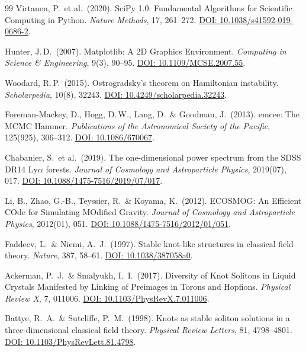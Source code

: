 \documentclass[aps,prd,twocolumn,superscriptaddress,nofootinbib]{revtex4-2}
\begin{document}
\begin{thebibliography}{99}
Virtanen, P.\ et al.\ (2020).
SciPy 1.0: Fundamental Algorithms for Scientific Computing in Python.
\textit{Nature Methods}, 17, 261--272.
\href{https://doi.org/10.1038/s41592-019-0686-2}{DOI: 10.1038/s41592-019-0686-2}.

Hunter, J.\,D.\ (2007).
Matplotlib: A 2D Graphics Environment.
\textit{Computing in Science \& Engineering}, 9(3), 90--95.
\href{https://doi.org/10.1109/MCSE.2007.55}{DOI: 10.1109/MCSE.2007.55}.

Woodard, R.\,P.\ (2015).
Ostrogradsky's theorem on Hamiltonian instability.
\textit{Scholarpedia}, 10(8), 32243.
\href{https://doi.org/10.4249/scholarpedia.32243}{DOI: 10.4249/scholarpedia.32243}.

Foreman-Mackey, D., Hogg, D.\,W., Lang, D.\ \& Goodman, J.\ (2013).
emcee: The MCMC Hammer.
\textit{Publications of the Astronomical Society of the Pacific}, 125(925), 306--312.
\href{https://doi.org/10.1086/670067}{DOI: 10.1086/670067}.

Chabanier, S.\ et al.\ (2019).
The one-dimensional power spectrum from the SDSS DR14 Ly$\alpha$ forests.
\textit{Journal of Cosmology and Astroparticle Physics}, 2019(07), 017.
\href{https://doi.org/10.1088/1475-7516/2019/07/017}{DOI: 10.1088/1475-7516/2019/07/017}.

Li, B., Zhao, G.-B., Teyssier, R.\ \& Koyama, K.\ (2012).
ECOSMOG: An Efficient COde for Simulating MOdified Gravity.
\textit{Journal of Cosmology and Astroparticle Physics}, 2012(01), 051.
\href{https://doi.org/10.1088/1475-7516/2012/01/051}{DOI: 10.1088/1475-7516/2012/01/051}.

Faddeev, L.\ \& Niemi, A.~J.\ (1997).
Stable knot-like structures in classical field theory.
\textit{Nature}, 387, 58--61.
\href{https://doi.org/10.1038/387058a0}{DOI: 10.1038/387058a0}.

Ackerman, P.~J.\ \& Smalyukh, I.~I.\ (2017).
Diversity of Knot Solitons in Liquid Crystals Manifested by Linking of Preimages in Torons and Hopfions.
\textit{Physical Review X}, 7, 011006.
\href{https://doi.org/10.1103/PhysRevX.7.011006}{DOI: 10.1103/PhysRevX.7.011006}.

Battye, R.~A.\ \& Sutcliffe, P.~M.\ (1998).
Knots as stable soliton solutions in a three-dimensional classical field theory.
\textit{Physical Review Letters}, 81, 4798--4801.
\href{https://doi.org/10.1103/PhysRevLett.81.4798}{DOI: 10.1103/PhysRevLett.81.4798}.


\end{thebibliography}
\end{document}
